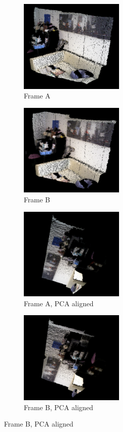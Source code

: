 \begin{figure}[!htb] 
        \centering
        \begin{subfigure}[b]{3.0in}
               \centering
                \includegraphics[width=2.0in]{images/methodology/FVR/fvr3d/frameA}
                \caption{Frame A}
                \label{fig:fvr3DINA}
        \end{subfigure}%
        \begin{subfigure}[b]{3.0in}
        		\centering
                \includegraphics[width=2.0in]{images/methodology/FVR/fvr3d/frameB}
                \caption{Frame B}
                \label{fig:fvr3DINB}
        \end{subfigure}
        
         \begin{subfigure}[b]{3.0in}
         		       \centering
                \includegraphics[width=2.0in]{images/methodology/FVR/fvr3d/PCAFrameA}
                \caption{Frame A, PCA aligned}
                \label{fig:fvr3DAAlign}
        \end{subfigure}%
         \begin{subfigure}[b]{3.0in}
                \centering
                \includegraphics[width=2.0in]{images/methodology/FVR/fvr3d/PCAFrameB}
				\caption{Frame B, PCA aligned}
                \label{fig:fvr3DBAlign}
        \end{subfigure}
        


\end{figure}
